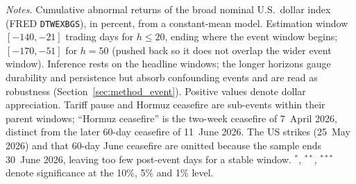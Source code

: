 \begin{table}[htbp]
\begin{threeparttable}
\begin{tablenotes}[flushleft]
\item \textit{Notes.} Cumulative abnormal returns of the broad nominal U.S.\ dollar
index (FRED \texttt{DTWEXBGS}), in percent, from a constant-mean model. Estimation
window $[-140,-21]$ trading days for $h\le 20$, ending where the event window begins;
$[-170,-51]$ for $h{=}50$ (pushed back so it does not overlap the wider event window).
Inference rests on the headline windows; the longer horizons gauge durability and
persistence but absorb confounding events and are read as robustness
(Section~\ref{sec:method_event}). Positive values denote dollar appreciation. Tariff
pause and Hormuz ceasefire are sub-events within their parent windows; ``Hormuz
ceasefire'' is the two-week ceasefire of 7~April 2026, distinct from the later 60-day
ceasefire of 11~June 2026. The US strikes (25~May 2026) and that 60-day June ceasefire
are omitted because the sample ends 30~June 2026, leaving too few post-event days for a
stable window.
$^{*}$, $^{**}$, $^{***}$ denote significance at the 10\%, 5\% and 1\% level.
\end{tablenotes}
\end{threeparttable}
\end{table}

